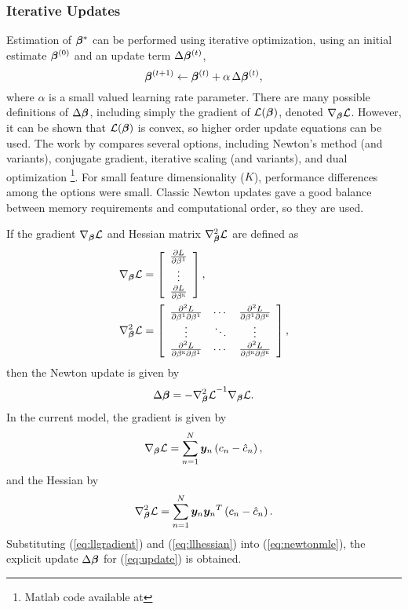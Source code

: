 \subsubsection{Iterative Updates}
Estimation of $\bm{\beta}^*$ can be performed using iterative optimization, using an initial estimate $\bm{\beta}^{(0)}$ and an update term $\Delta\bm{\beta}^{(t)}$,
\begin{equation}
\bm{\beta}^{(t+1)} \leftarrow \bm{\beta}^{(t)} + \alpha\thinspace\Delta\bm{\beta}^{(t)},
\label{eq:update}
\end{equation}
where $\alpha$ is a small valued learning rate parameter. There are many possible definitions of $\Delta\bm{\beta}$, including simply the gradient of $\mathcal{L}(\bm{\beta})$, denoted $\nabla_{\bm{\beta}}\mathcal{L}$. However, it can be shown that $\mathcal{L}(\bm{\beta})$ is convex, so higher order update equations can be used. The work by \citeauthor{Minka2003} \cite{Minka2003} compares several options, including Newton's method (and variants), conjugate gradient, iterative scaling (and variants), and dual optimization%
\footnote{Matlab code available at }.
For small feature dimensionality ($K$), performance differences among the options were small. Classic Newton updates gave a good balance between memory requirements and computational order, so they are used.
\par
If the gradient $\nabla_{\bm{\beta}}\mathcal{L}$ and Hessian matrix $\nabla^2_{\bm{\beta}}\mathcal{L}$ are defined as
\begin{align}
\nabla_{\bm{\beta}}\mathcal{L} &= \left[\begin{array}{c}
\frac{\partial L}{\partial\beta^1}\\\vdots\\\frac{\partial L}{\partial\beta^{\textsc{k}}}
\end{array}\right],\label{eq:llgradient0}\\
\nabla^2_{\bm{\beta}}\mathcal{L} &= \left[\begin{array}{ccc}
\frac{\partial^2 L}{\partial\beta^1\partial\beta^1}&\cdots&\frac{\partial^2 L}{\partial\beta^1\partial\beta^{\textsc{k}}}\\
\vdots&\ddots&\vdots\\
\frac{\partial^2 L}{\partial\beta^{\textsc{k}}\partial\beta^1}&\cdots&\frac{\partial^2 L}{\partial\beta^{\textsc{k}}\partial\beta^{\textsc{k}}}
\end{array}\right]\label{eq:llhessian0},
\end{align}
then the Newton update is given by
\begin{equation}
\Delta\bm{\beta} = -{\nabla^2_{\bm{\beta}}\mathcal{L}}^{-1}\nabla_{\bm{\beta}}\mathcal{L}.
\label{eq:newtonmle}
\end{equation}
In the current model, the gradient is given by 
\begin{equation}
\nabla_{\bm{\beta}}\mathcal{L} = \sum_{n=1}^{N} \bm{y}_n\left(c_n - \hat{c}_n\right),
\label{eq:llgradient}
\end{equation}
and the Hessian by
\begin{equation}
\nabla^2_{\bm{\beta}}\mathcal{L} = \sum_{n=1}^{N} \bm{y}_n{\bm{y}_n}^T \left(c_n - \hat{c}_n\right).
\label{eq:llhessian}
\end{equation}
Substituting (\ref{eq:llgradient}) and (\ref{eq:llhessian}) into (\ref{eq:newtonmle}), the explicit update  $\Delta\bm{\beta}$ for (\ref{eq:update}) is obtained.
